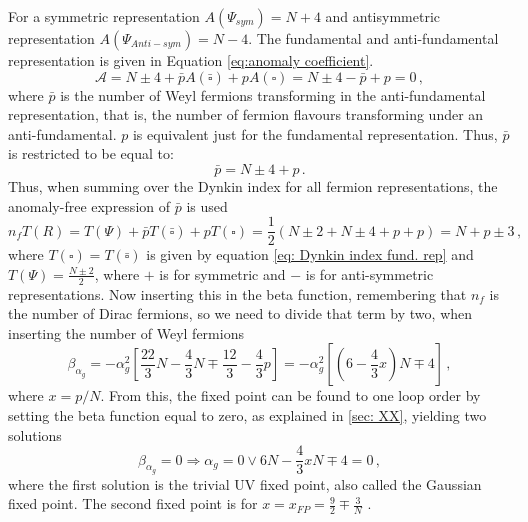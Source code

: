 For a symmetric representation $A(\Psi_{sym})=N+4$ and antisymmetric representation $A(\Psi_{Anti-sym})=N-4$. The fundamental and anti-fundamental representation is given in Equation \ref{eq:anomaly coefficient}. 
\begin{equation}
    \mathcal{A} = N\pm 4 + \bar p A(\bar{\square}) + p A({\square})= N\pm 4 - \bar p  +p= 0 \,,
\end{equation}
where $\bar p$ is the number of Weyl fermions transforming in the anti-fundamental representation, that is, the number of fermion flavours transforming under an anti-fundamental. $p$ is equivalent just for the fundamental representation. Thus, $\bar p$ is restricted to be equal to:
\begin{equation}
    \bar p= N\pm 4 + p  \,.
\end{equation}
Thus, when summing over the Dynkin index for all fermion representations, the anomaly-free expression of $\bar p $ is used 
\begin{equation}
    n_f T(R) = T(\Psi) + \bar p T(\bar{\square}) + p T({\square})=\frac{1}{2}\left(N\pm2 + N\pm 4 +p +p\right)=N+p\pm 3\,,
\end{equation}
where $T(\square)=T(\bar \square)$ is given by equation \ref{eq: Dynkin index fund. rep} and $T(\Psi)=\frac{N\pm2}{2}$, where $+$ is for symmetric and $-$ is for anti-symmetric representations.  
Now inserting this in the beta function, remembering that $n_f$ is the number of Dirac fermions, so we need to divide that term by two, when inserting the number of Weyl fermions 
\begin{equation}
    \beta_{\alpha_{g}}={-\alpha_g^2}\left[ \frac{22}{3}N-\frac{4}{3}N \mp \frac{12}{3}-\frac{4}{3}p\right]={-\alpha_g^2}\left[ \left(6-\frac{4}{3}x\right)N\mp 4\right]\,,
\end{equation}
where $x=p/N$. From this, the fixed point can be found to one loop order by setting the beta function equal to zero, as explained in \ref{sec: XX}, yielding two solutions
\begin{equation}
    \beta_{\alpha_{g}}=0\Rightarrow \alpha_g=0 \vee 6N-\frac{4}{3}xN \mp 4=0\,,
\end{equation}
where the first solution is the trivial UV fixed point, also called the Gaussian fixed point. The second fixed point is for $x=x_{FP}=\frac{9}{2}\mp \frac{3}{N}$ \cite{Molgaard:2016bqf} .